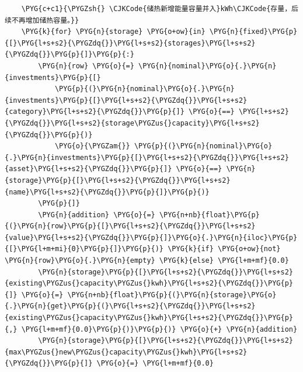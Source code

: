 \begin{Verbatim}
    \PYG{c+c1}{\PYGZsh{} \CJKCode{储热新增能量容量并入}kWh\CJKCode{存量，后续不再增加储热容量。}}
    \PYG{k}{for} \PYG{n}{storage} \PYG{o+ow}{in} \PYG{n}{fixed}\PYG{p}{[}\PYG{l+s+s2}{\PYGZdq{}}\PYG{l+s+s2}{storages}\PYG{l+s+s2}{\PYGZdq{}}\PYG{p}{]}\PYG{p}{:}
        \PYG{n}{row} \PYG{o}{=} \PYG{n}{nominal}\PYG{o}{.}\PYG{n}{investments}\PYG{p}{[}
            \PYG{p}{(}\PYG{n}{nominal}\PYG{o}{.}\PYG{n}{investments}\PYG{p}{[}\PYG{l+s+s2}{\PYGZdq{}}\PYG{l+s+s2}{category}\PYG{l+s+s2}{\PYGZdq{}}\PYG{p}{]} \PYG{o}{==} \PYG{l+s+s2}{\PYGZdq{}}\PYG{l+s+s2}{storage\PYGZus{}capacity}\PYG{l+s+s2}{\PYGZdq{}}\PYG{p}{)}
            \PYG{o}{\PYGZam{}} \PYG{p}{(}\PYG{n}{nominal}\PYG{o}{.}\PYG{n}{investments}\PYG{p}{[}\PYG{l+s+s2}{\PYGZdq{}}\PYG{l+s+s2}{asset}\PYG{l+s+s2}{\PYGZdq{}}\PYG{p}{]} \PYG{o}{==} \PYG{n}{storage}\PYG{p}{[}\PYG{l+s+s2}{\PYGZdq{}}\PYG{l+s+s2}{name}\PYG{l+s+s2}{\PYGZdq{}}\PYG{p}{]}\PYG{p}{)}
        \PYG{p}{]}
        \PYG{n}{addition} \PYG{o}{=} \PYG{n+nb}{float}\PYG{p}{(}\PYG{n}{row}\PYG{p}{[}\PYG{l+s+s2}{\PYGZdq{}}\PYG{l+s+s2}{value}\PYG{l+s+s2}{\PYGZdq{}}\PYG{p}{]}\PYG{o}{.}\PYG{n}{iloc}\PYG{p}{[}\PYG{l+m+mi}{0}\PYG{p}{]}\PYG{p}{)} \PYG{k}{if} \PYG{o+ow}{not} \PYG{n}{row}\PYG{o}{.}\PYG{n}{empty} \PYG{k}{else} \PYG{l+m+mf}{0.0}
        \PYG{n}{storage}\PYG{p}{[}\PYG{l+s+s2}{\PYGZdq{}}\PYG{l+s+s2}{existing\PYGZus{}capacity\PYGZus{}kwh}\PYG{l+s+s2}{\PYGZdq{}}\PYG{p}{]} \PYG{o}{=} \PYG{n+nb}{float}\PYG{p}{(}\PYG{n}{storage}\PYG{o}{.}\PYG{n}{get}\PYG{p}{(}\PYG{l+s+s2}{\PYGZdq{}}\PYG{l+s+s2}{existing\PYGZus{}capacity\PYGZus{}kwh}\PYG{l+s+s2}{\PYGZdq{}}\PYG{p}{,} \PYG{l+m+mf}{0.0}\PYG{p}{)}\PYG{p}{)} \PYG{o}{+} \PYG{n}{addition}
        \PYG{n}{storage}\PYG{p}{[}\PYG{l+s+s2}{\PYGZdq{}}\PYG{l+s+s2}{max\PYGZus{}new\PYGZus{}capacity\PYGZus{}kwh}\PYG{l+s+s2}{\PYGZdq{}}\PYG{p}{]} \PYG{o}{=} \PYG{l+m+mf}{0.0}


\end{Verbatim}
